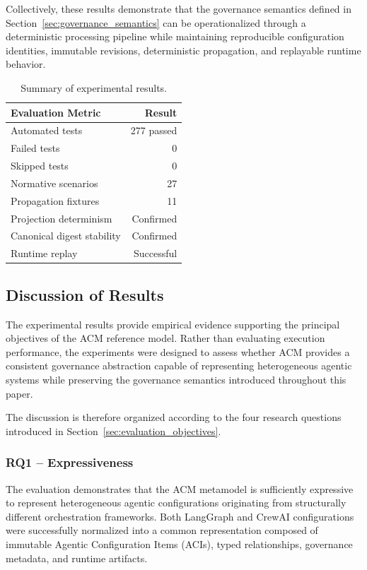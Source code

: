 \documentclass[10pt]{article}
\begin{document}
Collectively, these results demonstrate that the governance semantics defined in Section~\ref{sec:governance_semantics} can be operationalized through a deterministic processing pipeline while maintaining reproducible configuration identities, immutable revisions, deterministic propagation, and replayable runtime behavior.

\begin{table}[ht]
\centering
\caption{Summary of experimental results.}
\label{tab:experimental_results}

\begin{tabular}{lr}
\toprule
\textbf{Evaluation Metric} & \textbf{Result} \\
\midrule
Automated tests & 277 passed \\
Failed tests & 0 \\
Skipped tests & 0 \\
Normative scenarios & 27 \\
Propagation fixtures & 11 \\
Projection determinism & Confirmed \\
Canonical digest stability & Confirmed \\
Runtime replay & Successful \\
\bottomrule
\end{tabular}

\end{table}

\subsection{Discussion of Results}
\label{sec:discussion_results}

The experimental results provide empirical evidence supporting the principal objectives of the ACM reference model. Rather than evaluating execution performance, the experiments were designed to assess whether ACM provides a consistent governance abstraction capable of representing heterogeneous agentic systems while preserving the governance semantics introduced throughout this paper.

The discussion is therefore organized according to the four research questions introduced in Section~\ref{sec:evaluation_objectives}.

\subsubsection*{RQ1 -- Expressiveness}

The evaluation demonstrates that the ACM metamodel is sufficiently expressive to represent heterogeneous agentic configurations originating from structurally different orchestration frameworks. Both LangGraph and CrewAI configurations were successfully normalized into a common representation composed of immutable Agentic Configuration Items (ACIs), typed relationships, governance metadata, and runtime artifacts.
\end{document}
